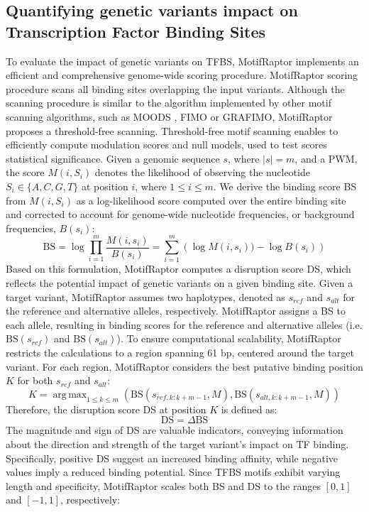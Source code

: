 \documentclass[a4paper, titlepage, openright]{book}
\DeclareMathOperator*{\argmax}{arg\,max}
\newcommand{\grafimo}{GRAFIMO\xspace}
\newcommand{\motifraptor}{MotifRaptor\xspace}
\begin{document}
\subsection{Quantifying genetic variants impact on Transcription Factor Binding Sites}
To evaluate the impact of genetic variants on TFBS, \motifraptor implements an efficient and comprehensive genome-wide scoring procedure. \motifraptor scoring procedure scans all binding sites overlapping the input variants. Although the scanning procedure is similar to the algorithm implemented by other motif scanning algorithms, such as MOODS \citep{korhonen2009moods}, FIMO \citep{grant2011fimo} or \grafimo \citep{tognon2021grafimo}, \motifraptor proposes a threshold-free scanning. Threshold-free motif scanning enables to efficiently compute modulation scores and null models, used to test scores statistical significance. Given a genomic sequence $s$, where $|s|=m$, and a PWM, the score $M(i,S_{i})$ denotes the likelihood of observing the nucleotide $S_{i}\in\{A,C,G,T\}$ at position $i$, where $1 \leq i \leq m.$ We derive the binding score BS from $M(i,S_{i})$ as a log-likelihood score computed over the entire binding site and corrected to account for genome-wide nucleotide frequencies, or background frequencies, $B(s_{i})$:
\[
	\text{BS} = \log{\prod^{m}_{i=1}{\frac{M(i,s_{i})}{B(s_{i})}}} = \sum^{m}_{i=1}{(\log{M(i, s_{i}))} - \log{B(s_{i})})}
\] 
Based on this formulation, \motifraptor computes a disruption score DS, which reflects the potential impact of genetic variants on a given binding site. Given a target variant, \motifraptor assumes two haplotypes, denoted as $s_{ref}$ and $s_{alt}$ for the reference and alternative alleles, respectively. \motifraptor assigns a BS to each allele, resulting in binding scores for the reference and alternative alleles (i.e.  $\text{BS}(s_{ref})$ and $\text{BS}(s_{alt})$). To ensure computational scalability, \motifraptor restricts the calculations to a region spanning 61 bp, centered around the target variant. For each region, \motifraptor considers the best putative binding position $K$ for both $s_{ref}$ and $s_{alt}$:
\[
	K = \argmax_{1 \leq k \leq m}(\text{BS}(s_{ref, k:k+m-1}, M), \text{BS}(s_{alt, k:k+m-1}, M))
\]
Therefore, the disruption score DS at position $K$ is defined as:
\[
	\text{DS} = \Delta \text{BS}
\]
The magnitude and sign of DS are valuable indicators, conveying information about the direction and strength of the target variant's impact on TF binding. Specifically, positive DS suggest an increased binding affinity, while negative values imply a reduced binding potential. Since TFBS motifs exhibit varying length and specificity, \motifraptor scales both BS and DS to the ranges $[0,1]$ and $[-1,1]$, respectively:
\end{document}
